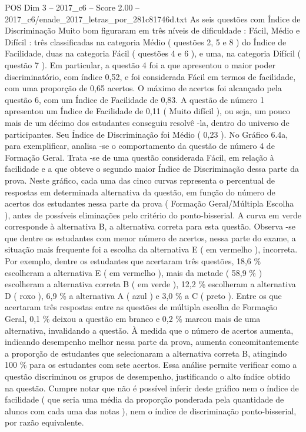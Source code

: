 \begin{textsample}{POS Dim 3 – 2017\_c6 – Score 2.00 – 2017\_c6/enade\_2017\_letras\_por\_281c81746d.txt}
As seis questões com Índice de Discriminação Muito bom figuraram em três níveis de dificuldade : Fácil, Médio e Difícil : três classificadas na categoria Médio ( questões 2, 5 e 8 ) do Índice de Facilidade, duas na categoria Fácil ( questões 4 e 6 ), e uma, na categoria Difícil ( questão 7 ).
Em particular, a questão 4 foi a que apresentou o maior poder discriminatório, com índice 0,52, e foi considerada Fácil em termos de facilidade, com uma proporção de 0,65 acertos.
O máximo de acertos foi alcançado pela questão 6, com um Índice de Facilidade de 0,83.
A questão de número 1 apresentou um Índice de Facilidade de 0,11 ( Muito difícil ), ou seja, um pouco mais de um décimo dos estudantes conseguiu resolvê -la, dentro do universo de participantes.
Seu Índice de Discriminação foi Médio ( 0,23 ).
No Gráfico 6.4a, para exemplificar, analisa -se o comportamento da questão de número 4 de Formação Geral.
Trata -se de uma questão considerada Fácil, em relação à facilidade e a que obteve o segundo maior Índice de Discriminação dessa parte da prova.
Neste gráfico, cada uma das cinco curvas representa o percentual de respostas em determinada alternativa da questão, em função do número de acertos dos estudantes nessa parte da prova ( Formação Geral/Múltipla Escolha ), antes de possíveis eliminações pelo critério do ponto-bisserial.
A curva em verde corresponde à alternativa B, a alternativa correta para esta questão.
Observa -se que dentre os estudantes com menor número de acertos, nessa parte do exame, a situação mais frequente foi a escolha da alternativa E ( em vermelho ), incorreta.
Por exemplo, dentre os estudantes que acertaram três questões, 18,6 \% escolheram a alternativa E ( em vermelho ), mais da metade ( 58,9 \% ) escolheram a alternativa correta B ( em verde ), 12,2 \% escolheram a alternativa D ( roxo ), 6,9 \% a alternativa A ( azul ) e 3,0 \% a C ( preto ).
Entre os que acertaram três respostas entre as questões de múltipla escolha de Formação Geral, 0,1 \% deixou a questão em branco e 0,2 \% marcou mais de uma alternativa, invalidando a questão.
À medida que o número de acertos aumenta, indicando desempenho melhor nessa parte da prova, aumenta concomitantemente a proporção de estudantes que selecionaram a alternativa correta B, atingindo 100 \% para os estudantes com sete acertos.
Essa análise permite verificar como a questão discriminou os grupos de desempenho, justificando o alto índice obtido na questão.
Cumpre notar que não é possível inferir deste gráfico nem o índice de facilidade ( que seria uma média da proporção ponderada pela quantidade de alunos com cada uma das notas ), nem o índice de discriminação ponto-bisserial, por razão equivalente.

\end{textsample}
